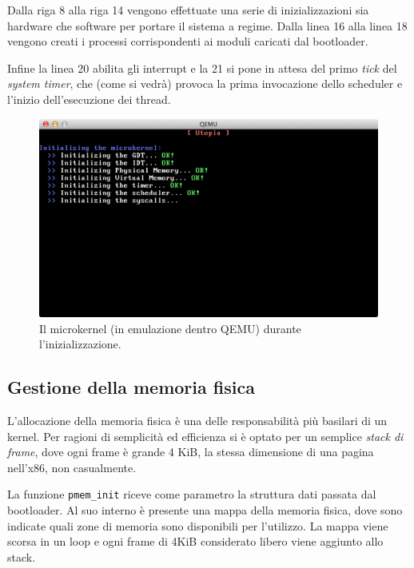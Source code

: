 \documentclass[12pt,a4paper]{report}
\begin{document}
			Dalla riga 8 alla riga 14 vengono effettuate una serie di inizializzazioni sia hardware che software
			per portare il sistema a regime. Dalla linea 16 alla linea 18 vengono creati i processi corrispondenti
			ai moduli caricati dal bootloader.
			
			Infine la linea 20 abilita gli interrupt e la 21 si pone in attesa del primo \emph{tick} del \emph{system timer},
			che (come si vedrà) provoca la prima invocazione dello scheduler e l'inizio dell'esecuzione dei thread.
			
			\begin{figure}[htbp]
			\centering
			\includegraphics[scale=0.55]{img/boot.png}
			\caption{Il microkernel (in emulazione dentro QEMU) durante l'inizializzazione.\label{fig:boot}}
			\end{figure}
		
		\subsection{Gestione della memoria fisica}
			L'allocazione della memoria fisica è una delle responsabilità più basilari di un kernel.
			Per ragioni di semplicità ed efficienza si è optato per un semplice \emph{stack di frame},
			dove ogni frame è grande 4 KiB, la stessa dimensione di una pagina nell'x86, non casualmente.
			
			
			
			La funzione \texttt{pmem\_init} riceve come parametro la struttura dati passata dal bootloader.
			Al suo interno è presente una mappa della memoria fisica, dove sono indicate quali
			zone di memoria sono disponibili per l'utilizzo. La mappa viene scorsa in un loop
			e ogni frame di 4KiB considerato libero viene aggiunto allo stack.
			
\end{document}
